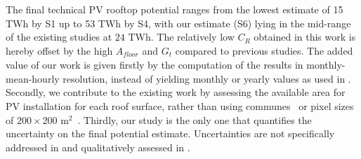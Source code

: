 The final technical PV rooftop potential ranges from the lowest estimate of 15 TWh by S1 up to 53 TWh by S4, with our estimate (S6) lying in the mid-range of the existing studies at $24$ TWh. 
The relatively low $C_R$ obtained in this work is hereby offset by the high $A_\mathit{floor}$ and $G_t$ compared to previous studies.
%
The added value of our work is given firstly by the computation of the results in monthly-mean-hourly resolution, instead of yielding monthly or yearly values as used in \cite{klauser_solarpotentialanalyse_2016, assouline_quantifying_2017, assouline_large-scale_2018}. Secondly, we contribute to the existing work by assessing the available area for PV installation for each roof surface, rather than using communes~\cite{assouline_quantifying_2017} or pixel sizes of $200 \times 200$ m$^2$~\cite{assouline_large-scale_2018}. Thirdly, our study is the only one that quantifies the uncertainty on the final potential estimate. 
Uncertainties are not specifically addressed in \cite{assouline_quantifying_2017, assouline_large-scale_2018, iea_potential_2002} and qualitatively assessed in \cite{klauser_solarpotentialanalyse_2016, buffat_scalable_2018}.


